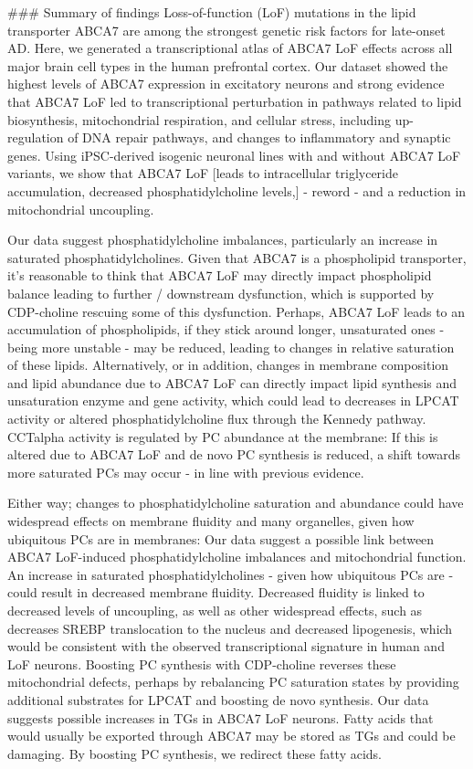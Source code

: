 
### Summary of findings
Loss-of-function (LoF) mutations in the lipid transporter ABCA7 are among the strongest genetic risk factors for late-onset AD. Here, we generated a transcriptional atlas of ABCA7 LoF effects across all major brain cell types in the human prefrontal cortex. Our dataset showed the highest levels of ABCA7 expression in excitatory neurons and strong evidence that ABCA7 LoF led to transcriptional perturbation in pathways related to lipid biosynthesis, mitochondrial respiration, and cellular stress, including up-regulation of DNA repair pathways, and changes to inflammatory and synaptic genes. Using iPSC-derived isogenic neuronal lines with and without ABCA7 LoF variants, we show that ABCA7 LoF [leads to intracellular triglyceride accumulation, decreased phosphatidylcholine levels,] - reword - and a reduction in mitochondrial uncoupling.

Our data suggest phosphatidylcholine imbalances, particularly an increase in saturated phosphatidylcholines. Given that ABCA7 is a phospholipid transporter, it's reasonable to think that ABCA7 LoF may directly impact phospholipid balance leading to further / downstream dysfunction, which is supported by CDP-choline rescuing some of this dysfunction. Perhaps, ABCA7 LoF leads to an accumulation of phospholipids, if they stick around longer, unsaturated ones - being more unstable - may be reduced, leading to changes in relative saturation of these lipids. Alternatively, or in addition, changes in membrane composition and lipid abundance due to ABCA7 LoF can directly impact lipid synthesis and unsaturation enzyme and gene activity, which could lead to decreases in LPCAT activity or altered phosphatidylcholine flux through the Kennedy pathway. CCTalpha activity is regulated by PC abundance at the membrane: If this is altered due to ABCA7 LoF and de novo PC synthesis is reduced, a shift towards more saturated PCs may occur - in line with previous evidence.   

Either way; changes to phosphatidylcholine saturation and abundance could have widespread effects on membrane fluidity and many organelles, given how ubiquitous PCs are in membranes: Our data suggest a possible link between ABCA7 LoF-induced phosphatidylcholine imbalances and mitochondrial function. An increase in saturated phosphatidylcholines - given how ubiquitous PCs are - could result in decreased membrane fluidity. Decreased fluidity is linked to decreased levels of uncoupling, as well as other widespread effects, such as decreases SREBP translocation to the nucleus and decreased lipogenesis, which would be consistent with the observed transcriptional signature in human and LoF neurons. Boosting PC synthesis with CDP-choline reverses these mitochondrial defects, perhaps by rebalancing PC saturation states by providing additional substrates for LPCAT and boosting de novo synthesis. Our data suggests possible increases in TGs in ABCA7 LoF neurons. Fatty acids that would usually be exported through ABCA7 may be stored as TGs and could be damaging. By boosting PC synthesis, we redirect these fatty acids.     


